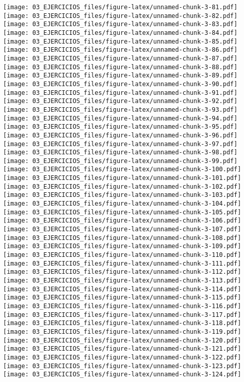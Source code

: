\documentclass[
]{book}
\begin{document}
\texttt{[image: 03\_EJERCICIOS\_files/figure-latex/unnamed-chunk-3-81.pdf]} \texttt{[image: 03\_EJERCICIOS\_files/figure-latex/unnamed-chunk-3-82.pdf]} \texttt{[image: 03\_EJERCICIOS\_files/figure-latex/unnamed-chunk-3-83.pdf]} \texttt{[image: 03\_EJERCICIOS\_files/figure-latex/unnamed-chunk-3-84.pdf]} \texttt{[image: 03\_EJERCICIOS\_files/figure-latex/unnamed-chunk-3-85.pdf]} \texttt{[image: 03\_EJERCICIOS\_files/figure-latex/unnamed-chunk-3-86.pdf]} \texttt{[image: 03\_EJERCICIOS\_files/figure-latex/unnamed-chunk-3-87.pdf]} \texttt{[image: 03\_EJERCICIOS\_files/figure-latex/unnamed-chunk-3-88.pdf]} \texttt{[image: 03\_EJERCICIOS\_files/figure-latex/unnamed-chunk-3-89.pdf]} \texttt{[image: 03\_EJERCICIOS\_files/figure-latex/unnamed-chunk-3-90.pdf]} \texttt{[image: 03\_EJERCICIOS\_files/figure-latex/unnamed-chunk-3-91.pdf]} \texttt{[image: 03\_EJERCICIOS\_files/figure-latex/unnamed-chunk-3-92.pdf]} \texttt{[image: 03\_EJERCICIOS\_files/figure-latex/unnamed-chunk-3-93.pdf]} \texttt{[image: 03\_EJERCICIOS\_files/figure-latex/unnamed-chunk-3-94.pdf]} \texttt{[image: 03\_EJERCICIOS\_files/figure-latex/unnamed-chunk-3-95.pdf]} \texttt{[image: 03\_EJERCICIOS\_files/figure-latex/unnamed-chunk-3-96.pdf]} \texttt{[image: 03\_EJERCICIOS\_files/figure-latex/unnamed-chunk-3-97.pdf]} \texttt{[image: 03\_EJERCICIOS\_files/figure-latex/unnamed-chunk-3-98.pdf]} \texttt{[image: 03\_EJERCICIOS\_files/figure-latex/unnamed-chunk-3-99.pdf]} \texttt{[image: 03\_EJERCICIOS\_files/figure-latex/unnamed-chunk-3-100.pdf]} \texttt{[image: 03\_EJERCICIOS\_files/figure-latex/unnamed-chunk-3-101.pdf]} \texttt{[image: 03\_EJERCICIOS\_files/figure-latex/unnamed-chunk-3-102.pdf]} \texttt{[image: 03\_EJERCICIOS\_files/figure-latex/unnamed-chunk-3-103.pdf]} \texttt{[image: 03\_EJERCICIOS\_files/figure-latex/unnamed-chunk-3-104.pdf]} \texttt{[image: 03\_EJERCICIOS\_files/figure-latex/unnamed-chunk-3-105.pdf]} \texttt{[image: 03\_EJERCICIOS\_files/figure-latex/unnamed-chunk-3-106.pdf]} \texttt{[image: 03\_EJERCICIOS\_files/figure-latex/unnamed-chunk-3-107.pdf]} \texttt{[image: 03\_EJERCICIOS\_files/figure-latex/unnamed-chunk-3-108.pdf]} \texttt{[image: 03\_EJERCICIOS\_files/figure-latex/unnamed-chunk-3-109.pdf]} \texttt{[image: 03\_EJERCICIOS\_files/figure-latex/unnamed-chunk-3-110.pdf]} \texttt{[image: 03\_EJERCICIOS\_files/figure-latex/unnamed-chunk-3-111.pdf]} \texttt{[image: 03\_EJERCICIOS\_files/figure-latex/unnamed-chunk-3-112.pdf]} \texttt{[image: 03\_EJERCICIOS\_files/figure-latex/unnamed-chunk-3-113.pdf]} \texttt{[image: 03\_EJERCICIOS\_files/figure-latex/unnamed-chunk-3-114.pdf]} \texttt{[image: 03\_EJERCICIOS\_files/figure-latex/unnamed-chunk-3-115.pdf]} \texttt{[image: 03\_EJERCICIOS\_files/figure-latex/unnamed-chunk-3-116.pdf]} \texttt{[image: 03\_EJERCICIOS\_files/figure-latex/unnamed-chunk-3-117.pdf]} \texttt{[image: 03\_EJERCICIOS\_files/figure-latex/unnamed-chunk-3-118.pdf]} \texttt{[image: 03\_EJERCICIOS\_files/figure-latex/unnamed-chunk-3-119.pdf]} \texttt{[image: 03\_EJERCICIOS\_files/figure-latex/unnamed-chunk-3-120.pdf]} \texttt{[image: 03\_EJERCICIOS\_files/figure-latex/unnamed-chunk-3-121.pdf]} \texttt{[image: 03\_EJERCICIOS\_files/figure-latex/unnamed-chunk-3-122.pdf]} \texttt{[image: 03\_EJERCICIOS\_files/figure-latex/unnamed-chunk-3-123.pdf]} \texttt{[image: 03\_EJERCICIOS\_files/figure-latex/unnamed-chunk-3-124.pdf]} 
\end{document}
